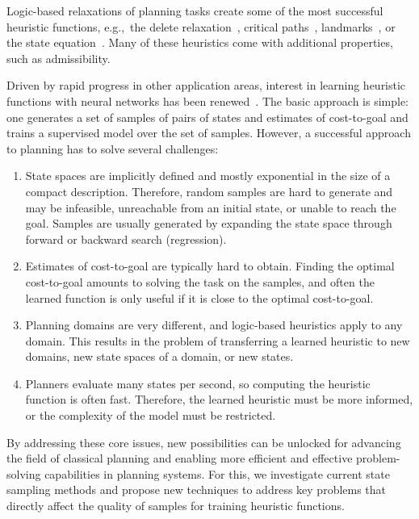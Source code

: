 Logic-based relaxations of planning tasks create some of the most successful heuristic functions, e.g.,~the delete relaxation~\cite{Hoffmann.Nebel/2001}, critical paths~\cite{haslum-geffner-aips2000}, landmarks~\cite{hoffmann-et-al-jair2004,Karpas.Domshlak/2009}, or the state equation~\cite{bonet-ijcai2013}. Many of these heuristics come with additional properties, such as admissibility.

Driven by rapid progress in other application areas, interest in learning heuristic functions with neural networks has been renewed~\cite{samadi-et-al-aaai2008,Arfaee.etal/2011,Agostinelli.etal/2019,Yu.etal/2020,Shen.etal/2020,Ferber.etal/2020a,Toyer.etal/2020,Ferber.etal/2022,OToole/2022}. The basic approach is simple: one generates a set of samples of pairs of states and estimates of cost-to-goal and trains a supervised model over the set of samples. However, a successful approach to planning has to solve several challenges:

\begin{enumerate}[label=C\arabic*),left=0pt]
    \itemsep0pt
    \item State spaces are implicitly defined and mostly exponential in the size of a compact description. Therefore, random samples are hard to generate and may be infeasible, unreachable from an initial state, or unable to reach the goal. Samples are usually generated by expanding the state space through forward or backward search (regression).
    \item Estimates of cost-to-goal are typically hard to obtain. Finding the optimal cost-to-goal amounts to solving the task on the samples, and often the learned function is only useful if it is close to the optimal cost-to-goal.
    \item Planning domains are very different, and logic-based heuristics apply to any domain. This results in the problem of transferring a learned heuristic to new domains, new state spaces of a domain, or new states.
    \item Planners evaluate many states per second, so computing the heuristic function is often fast. Therefore, the learned heuristic must be more informed, or the complexity of the model must be restricted.
\end{enumerate}

By addressing these core issues, new possibilities can be unlocked for advancing the field of classical planning and enabling more efficient and effective problem-solving capabilities in planning systems.  For this, we investigate current state sampling methods and propose new techniques to address key problems that directly affect the quality of samples for training heuristic functions.

